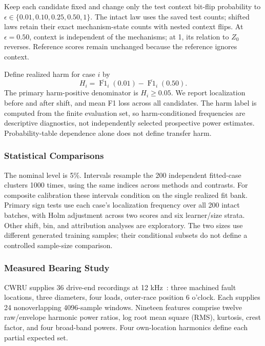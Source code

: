 \documentclass[conference]{IEEEtran}
\begin{document}
Keep each candidate fixed and change only the test context bit-flip probability to $\epsilon\in\{0.01,0.10,0.25,0.50,1\}$. The intact law uses the saved test counts; shifted laws retain their exact mechanism-state counts with nested context flips. At $\epsilon=0.50$, context is independent of the mechanisms; at 1, its relation to $Z_0$ reverses. Reference scores remain unchanged because the reference ignores context.

Define realized harm for case $i$ by
\begin{equation}
 H_i=\overline{\operatorname{F1}}_i(0.01)-\overline{\operatorname{F1}}_i(0.50).
\end{equation}
The primary harm-positive denominator is $H_i\geq0.05$. We report localization before and after shift, and mean F1 loss across all candidates. The harm label is computed from the finite evaluation set, so harm-conditioned frequencies are descriptive diagnostics, not independently selected prospective power estimates. Probability-table dependence alone does not define transfer harm.

\subsubsection{Statistical Comparisons}
The nominal level is 5\%. Intervals resample the 200 independent fitted-case clusters 1000 times, using the same indices across methods and contrasts. For composite calibration these intervals condition on the single realized fit bank. Primary sign tests use each case's localization frequency over all 200 intact batches, with Holm adjustment across two scores and six learner/size strata. Other shift, bin, and attribution analyses are exploratory. The two sizes use different generated training samples; their conditional subsets do not define a controlled sample-size comparison.

\subsubsection{Measured Bearing Study}
CWRU supplies 36 drive-end recordings at 12 kHz~\cite{cwru2026}: three machined fault locations, three diameters, four loads, outer-race position 6 o'clock. Each supplies 24 nonoverlapping 4096-sample windows. Nineteen features comprise twelve raw/envelope harmonic power ratios, log root mean square (RMS), kurtosis, crest factor, and four broad-band powers. Four own-location harmonics define each partial expected set.
\end{document}
